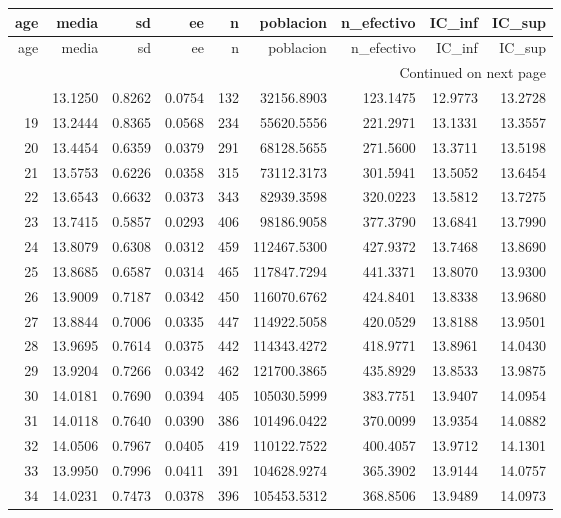 \begin{longtable}{rrrrrrrrr}
\toprule
age & media & sd & ee & n & poblacion & n\_efectivo & IC\_inf & IC\_sup \\
\midrule
\endfirsthead
\toprule
age & media & sd & ee & n & poblacion & n\_efectivo & IC\_inf & IC\_sup \\
\midrule
\endhead
\midrule
\multicolumn{9}{r}{Continued on next page} \\
\midrule
\endfoot
\bottomrule
\endlastfoot
18 & 13.1250 & 0.8262 & 0.0754 & 132 & 32156.8903 & 123.1475 & 12.9773 & 13.2728 \\
19 & 13.2444 & 0.8365 & 0.0568 & 234 & 55620.5556 & 221.2971 & 13.1331 & 13.3557 \\
20 & 13.4454 & 0.6359 & 0.0379 & 291 & 68128.5655 & 271.5600 & 13.3711 & 13.5198 \\
21 & 13.5753 & 0.6226 & 0.0358 & 315 & 73112.3173 & 301.5941 & 13.5052 & 13.6454 \\
22 & 13.6543 & 0.6632 & 0.0373 & 343 & 82939.3598 & 320.0223 & 13.5812 & 13.7275 \\
23 & 13.7415 & 0.5857 & 0.0293 & 406 & 98186.9058 & 377.3790 & 13.6841 & 13.7990 \\
24 & 13.8079 & 0.6308 & 0.0312 & 459 & 112467.5300 & 427.9372 & 13.7468 & 13.8690 \\
25 & 13.8685 & 0.6587 & 0.0314 & 465 & 117847.7294 & 441.3371 & 13.8070 & 13.9300 \\
26 & 13.9009 & 0.7187 & 0.0342 & 450 & 116070.6762 & 424.8401 & 13.8338 & 13.9680 \\
27 & 13.8844 & 0.7006 & 0.0335 & 447 & 114922.5058 & 420.0529 & 13.8188 & 13.9501 \\
28 & 13.9695 & 0.7614 & 0.0375 & 442 & 114343.4272 & 418.9771 & 13.8961 & 14.0430 \\
29 & 13.9204 & 0.7266 & 0.0342 & 462 & 121700.3865 & 435.8929 & 13.8533 & 13.9875 \\
30 & 14.0181 & 0.7690 & 0.0394 & 405 & 105030.5999 & 383.7751 & 13.9407 & 14.0954 \\
31 & 14.0118 & 0.7640 & 0.0390 & 386 & 101496.0422 & 370.0099 & 13.9354 & 14.0882 \\
32 & 14.0506 & 0.7967 & 0.0405 & 419 & 110122.7522 & 400.4057 & 13.9712 & 14.1301 \\
33 & 13.9950 & 0.7996 & 0.0411 & 391 & 104628.9274 & 365.3902 & 13.9144 & 14.0757 \\
34 & 14.0231 & 0.7473 & 0.0378 & 396 & 105453.5312 & 368.8506 & 13.9489 & 14.0973 \\

\end{longtable}
